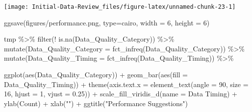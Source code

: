 \documentclass[
]{article}
\newenvironment{Shaded}{\begin{snugshade}}{\end{snugshade}}
\newcommand{\AttributeTok}[1]{\textcolor[rgb]{0.77,0.63,0.00}{#1}}
\newcommand{\DecValTok}[1]{\textcolor[rgb]{0.00,0.00,0.81}{#1}}
\newcommand{\FloatTok}[1]{\textcolor[rgb]{0.00,0.00,0.81}{#1}}
\newcommand{\FunctionTok}[1]{\textcolor[rgb]{0.00,0.00,0.00}{#1}}
\newcommand{\NormalTok}[1]{#1}
\newcommand{\SpecialCharTok}[1]{\textcolor[rgb]{0.00,0.00,0.00}{#1}}
\newcommand{\StringTok}[1]{\textcolor[rgb]{0.31,0.60,0.02}{#1}}
\begin{document}
\begin{center}\texttt{[image: Initial-Data-Review\_files/figure-latex/unnamed-chunk-23-1]} \end{center}

\begin{Shaded}
\begin{Highlighting}[]
\FunctionTok{ggsave}\NormalTok{(}\StringTok{\textquotesingle{}figures/performance.png\textquotesingle{}}\NormalTok{, }\AttributeTok{type=}\StringTok{\textquotesingle{}cairo\textquotesingle{}}\NormalTok{,}
         \AttributeTok{width =} \DecValTok{6}\NormalTok{, }\AttributeTok{height =} \DecValTok{6}\NormalTok{)}
\end{Highlighting}
\end{Shaded}

\begin{Shaded}
\begin{Highlighting}[]
\NormalTok{tmp }\SpecialCharTok{\%\textgreater{}\%}
  \FunctionTok{filter}\NormalTok{(}\SpecialCharTok{!} \FunctionTok{is.na}\NormalTok{(Data\_Quality\_Category))  }\SpecialCharTok{\%\textgreater{}\%}
  \FunctionTok{mutate}\NormalTok{(}\AttributeTok{Data\_Quality\_Category =} \FunctionTok{fct\_infreq}\NormalTok{(Data\_Quality\_Category)) }\SpecialCharTok{\%\textgreater{}\%}
  \FunctionTok{mutate}\NormalTok{(}\AttributeTok{Data\_Quality\_Timing =} \FunctionTok{fct\_infreq}\NormalTok{(Data\_Quality\_Timing)) }\SpecialCharTok{\%\textgreater{}\%}
   
  \FunctionTok{ggplot}\NormalTok{(}\FunctionTok{aes}\NormalTok{(Data\_Quality\_Category)) }\SpecialCharTok{+}
  \FunctionTok{geom\_bar}\NormalTok{(}\FunctionTok{aes}\NormalTok{(}\AttributeTok{fill =}\NormalTok{ Data\_Quality\_Timing)) }\SpecialCharTok{+}
  \FunctionTok{theme}\NormalTok{(}\AttributeTok{axis.text.x =} \FunctionTok{element\_text}\NormalTok{(}\AttributeTok{angle =} \DecValTok{90}\NormalTok{, }\AttributeTok{size =} \DecValTok{16}\NormalTok{,}
                                   \AttributeTok{hjust =} \DecValTok{1}\NormalTok{, }\AttributeTok{vjust =} \FloatTok{0.25}\NormalTok{)) }\SpecialCharTok{+}
  \FunctionTok{scale\_fill\_viridis\_d}\NormalTok{(}\AttributeTok{name =} \StringTok{\textquotesingle{}Data Timing\textquotesingle{}}\NormalTok{) }\SpecialCharTok{+}
  \FunctionTok{ylab}\NormalTok{(}\StringTok{\textquotesingle{}Count\textquotesingle{}}\NormalTok{) }\SpecialCharTok{+}
  \FunctionTok{xlab}\NormalTok{(}\StringTok{""}\NormalTok{) }\SpecialCharTok{+}
  \FunctionTok{ggtitle}\NormalTok{(}\StringTok{"Performance Suggestions"}\NormalTok{)}
\end{Highlighting}
\end{Shaded}
\end{document}
